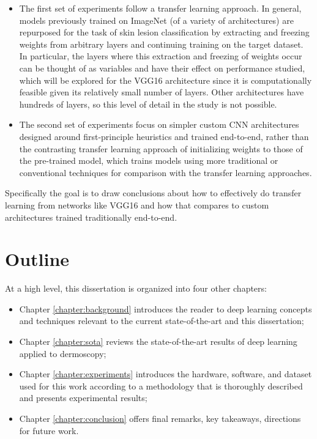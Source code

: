 \begin{itemize}
    \item The first set of experiments follow a transfer learning approach. In general, models previously trained on ImageNet (of a variety of architectures) are repurposed for the task of skin lesion classification by extracting and freezing weights from arbitrary layers and continuing training on the target dataset. In particular, the layers where this extraction and freezing of weights occur can be thought of as variables and have their effect on performance studied, which will be explored for the VGG16 architecture since it is computationally feasible given its relatively small number of layers. Other architectures have hundreds of layers, so this level of detail in the study is not possible.
    \item The second set of experiments focus on simpler custom \ac{CNN} architectures designed around first-principle heuristics and trained end-to-end, rather than the contrasting transfer learning approach of initializing weights to those of the pre-trained model, which trains models using more traditional or conventional techniques for comparison with the transfer learning approaches.
\end{itemize}

Specifically the goal is to draw conclusions about how to effectively do transfer learning from networks like VGG16 and how that compares to custom architectures trained traditionally end-to-end.

\section{Outline}

At a high level, this dissertation is organized into four other chapters:

\begin{itemize}
    \item Chapter \ref{chapter:background} introduces the reader to deep learning concepts and techniques relevant to the current state-of-the-art and this dissertation;
    \item Chapter \ref{chapter:sota} reviews the state-of-the-art results of deep learning applied to dermoscopy;
    \item Chapter \ref{chapter:experiments} introduces the hardware, software, and dataset used for this work according to a methodology that is thoroughly described and presents experimental results;
    \item Chapter \ref{chapter:conclusion} offers final remarks, key takeaways, directions for future work.
\end{itemize}
